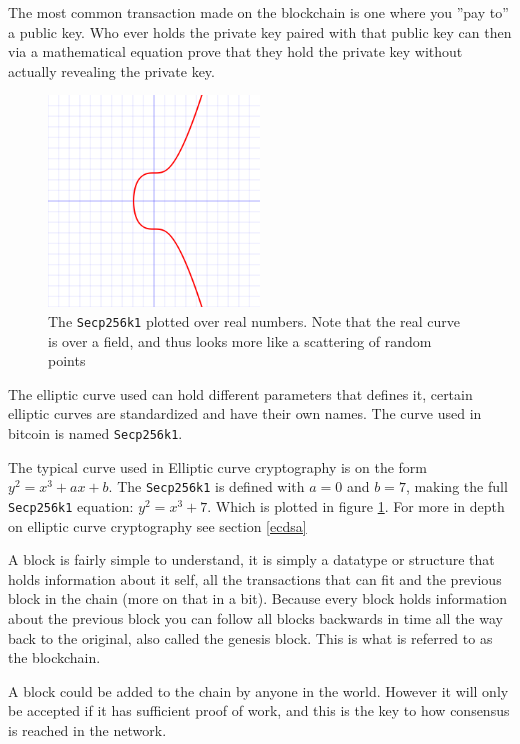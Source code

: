 The most common transaction made on the blockchain is one where you ''pay to''
a public key. Who ever holds the private key paired with that public key can
then via a mathematical equation prove that they hold the private key without
actually revealing the private key.\cite{quantabytes}

\begin{figure}[H]
	\centering
	\includegraphics[width=0.5\textwidth]{introduction/images/Secp256k1.png}
	\caption{The \texttt{Secp256k1} plotted over real numbers. Note that the real
	curve is over a field, and thus looks more like a scattering of random points}
	\label{fig:eccbasic}
\end{figure}

The elliptic curve used can hold different parameters that defines it, certain
elliptic curves are standardized and have their own names. The curve used in
bitcoin is named \texttt{Secp256k1}.\cite{Secp256k1_def}\cite{antonopoulos_2017}

The typical curve used in Elliptic curve cryptography is on the form
$y^2=x^3+ax+b$. The \texttt{Secp256k1} is defined with $a=0$ and $b=7$, making
the full \texttt{Secp256k1} equation: $y^2=x^3+7$. Which is plotted in figure
\ref*{fig:eccbasic}. For more in depth on elliptic curve cryptography see
section \ref{ecdsa}

A block is fairly simple to understand, it is simply a datatype or structure
that holds information about it self, all the transactions that can fit and the
previous block in the chain (more on that in a bit). Because every block holds
information about the previous block you can follow all blocks backwards in time
all the way back to the original, also called the genesis block.\cite{genesis}
This is what is referred to as the blockchain.

A block could be added to the chain by anyone in the world. However it will only
be accepted if it has sufficient proof of work, and this is the key to how
consensus is reached in the network.\cite{antonopoulos_2017}

